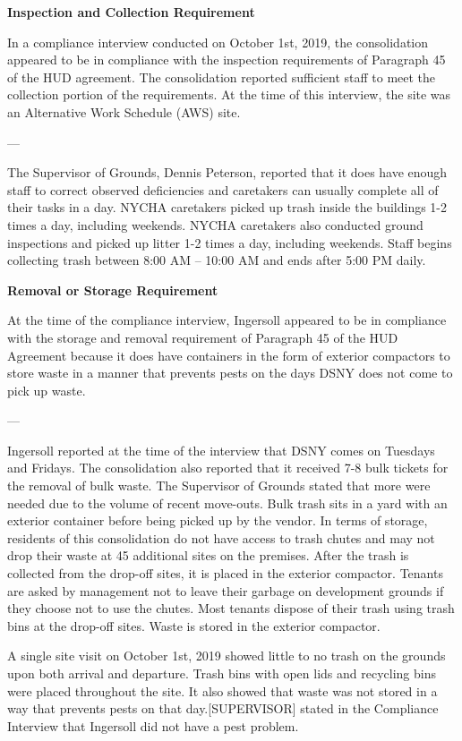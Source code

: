 
\textbf{Inspection and Collection Requirement}

In a compliance interview conducted on October 1st, 2019, the consolidation appeared to be in compliance with the inspection requirements of Paragraph 45 of the HUD agreement. The consolidation reported sufficient staff to meet the collection portion of the requirements. At the time of this interview, the site was an Alternative Work Schedule (AWS) site. 

---

The Supervisor of Grounds, Dennis Peterson, reported that it does have enough staff to correct observed deficiencies and caretakers can usually complete all of their tasks in a day. NYCHA caretakers picked up trash inside the buildings 1-2 times a day, including weekends. NYCHA caretakers also conducted ground inspections and picked up litter 1-2 times a day, including weekends. Staff begins collecting trash between 8:00 AM -- 10:00 AM and ends after 5:00 PM daily. 

\textbf{Removal or Storage Requirement}

At the time of the compliance interview, Ingersoll appeared to be in compliance with the storage and removal requirement of Paragraph 45 of the HUD Agreement because it does have containers in the form of exterior compactors to store waste in a manner that prevents pests on the days DSNY does not come to pick up waste.

---

Ingersoll reported at the time of the interview that DSNY comes on Tuesdays and Fridays. The consolidation also reported that it received 7-8 bulk tickets for the removal of bulk waste. The Supervisor of Grounds stated that more were needed due to the volume of recent move-outs. Bulk trash sits in a yard with an exterior container before being picked up by the vendor. In terms of storage, residents of this consolidation do not have access to trash chutes and may not drop their waste at 45 additional sites on the premises. After the trash is collected from the drop-off sites, it is placed in the exterior compactor. Tenants are asked by management not to leave their garbage on development grounds if they choose not to use the chutes. Most tenants dispose of their trash using trash bins at the drop-off sites. Waste is stored in the exterior compactor. 

A single site visit on October 1st, 2019 showed little to no trash on the grounds upon both arrival and departure.  Trash bins with open lids and recycling bins were placed throughout the site. It also showed that waste was not stored in a way that prevents pests on that day.[SUPERVISOR] stated in the Compliance Interview that Ingersoll did not have a pest problem.

